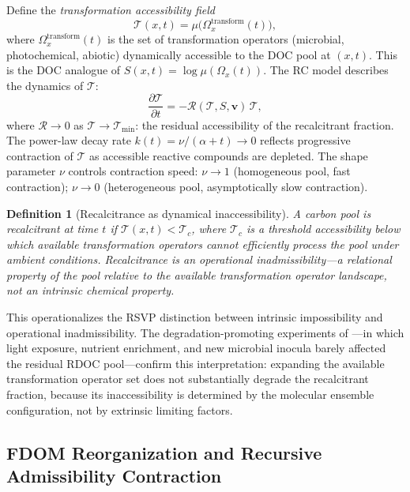 \documentclass[12pt]{article}
\newtheorem{definition}{Definition}
\newcommand{\Tcal}{\mathcal{T}}
\begin{document}
Define the \emph{transformation accessibility field}
\begin{equation}
\label{eq:accessibility}
\Tcal(x,t) = \mu\!\bigl(\Omega^\text{transform}_x(t)\bigr),
\end{equation}
where $\Omega^\text{transform}_x(t)$ is the set of transformation operators (microbial,
photochemical, abiotic) dynamically accessible to the DOC pool at $(x,t)$. This is the
DOC analogue of $S(x,t)=\log\mu(\Omega_x(t))$. The RC model describes the dynamics of
$\Tcal$:
\begin{equation}
\label{eq:rdoc-dynamics}
\frac{\partial\Tcal}{\partial t} = -\mathcal{R}(\Tcal,S,\mathbf{v})\,\Tcal,
\end{equation}
where $\mathcal{R}\to 0$ as $\Tcal\to\Tcal_{\min}$: the residual accessibility of the
recalcitrant fraction. The power-law decay rate $k(t)=\nu/(\alpha+t)\to 0$ reflects
progressive contraction of $\Tcal$ as accessible reactive compounds are depleted. The
shape parameter $\nu$ controls contraction speed: $\nu\to 1$ (homogeneous pool, fast
contraction); $\nu\to 0$ (heterogeneous pool, asymptotically slow contraction).

\begin{definition}[Recalcitrance as dynamical inaccessibility]
A carbon pool is \emph{recalcitrant} at time $t$ if $\Tcal(x,t)<\Tcal_c$, where
$\Tcal_c$ is a threshold accessibility below which available transformation operators
cannot efficiently process the pool under ambient conditions. Recalcitrance is an
\emph{operational inadmissibility}---a relational property of the pool relative to the
available transformation operator landscape, not an intrinsic chemical property.
\end{definition}

This operationalizes the RSVP distinction between intrinsic impossibility and operational
inadmissibility. The degradation-promoting experiments of \citet{Watanabe2026}---in which
light exposure, nutrient enrichment, and new microbial inocula barely affected the residual
RDOC pool---confirm this interpretation: expanding the available transformation operator
set does not substantially degrade the recalcitrant fraction, because its inaccessibility
is determined by the molecular ensemble configuration, not by extrinsic limiting factors.

\subsection{FDOM Reorganization and Recursive Admissibility Contraction}
\end{document}
